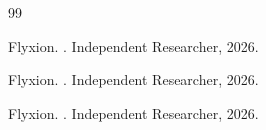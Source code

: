 \documentclass[12pt,twoside,openright]{book}
\begin{document}
\begin{thebibliography}{99}

Flyxion.
.
\newblock Independent Researcher, 2026.

Flyxion.
.
\newblock Independent Researcher, 2026.

Flyxion.
.
\newblock Independent Researcher, 2026.

\end{thebibliography}


\printglossaries

\printindex
\end{document}
